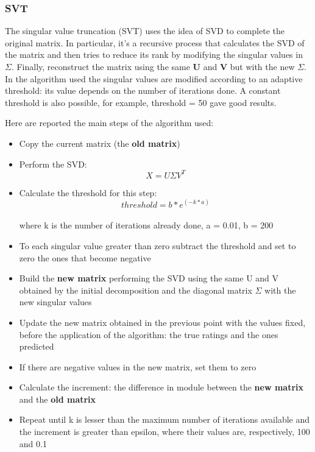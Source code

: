 \documentclass{article}
\begin{document}
\subsubsection{SVT}
The singular value truncation (SVT) uses the idea of SVD to complete the original matrix. In particular, it's a recursive process that calculates the SVD of the matrix and then tries to reduce its rank by modifying the singular values in $\Sigma$. Finally, reconstruct the matrix using the same \textbf{U} and \textbf{V} but with the new $\Sigma$. In the algorithm used the singular values are modified according to an adaptive threshold: its value depends on the number of iterations done. A constant threshold is also possible, for example, threshold = 50 gave good results.\newline

Here are reported the main steps of the algorithm used:

\begin{itemize}
    \item Copy the current matrix (the \textbf{old matrix})
    \item Perform the SVD: \begin{equation}X = U\Sigma V^T\end{equation}
    \item Calculate the threshold for this step: \begin{equation}
        threshold = b * e^{(-k * a)}
    \end{equation}\\
    where k is the number of iterations already done, a = 0.01, b = 200
    \item To each singular value greater than zero subtract the threshold and set to zero the ones that become negative
    \item Build the \textbf{new matrix} performing the SVD using the same U and V obtained by the initial decomposition and the diagonal matrix $\Sigma$ with the new singular values
    \item Update the new matrix obtained in the previous point with the values fixed, before the application of the algorithm: the true ratings and the ones predicted
    \item If there are negative values in the new matrix, set them to zero
    \item Calculate the increment: the difference in module between the \textbf{new matrix} and the \textbf{old matrix}
    \item Repeat until k is lesser than the maximum number of iterations available and the increment is greater than epsilon, where their values are, respectively, 100 and 0.1
\end{itemize}
\end{document}
